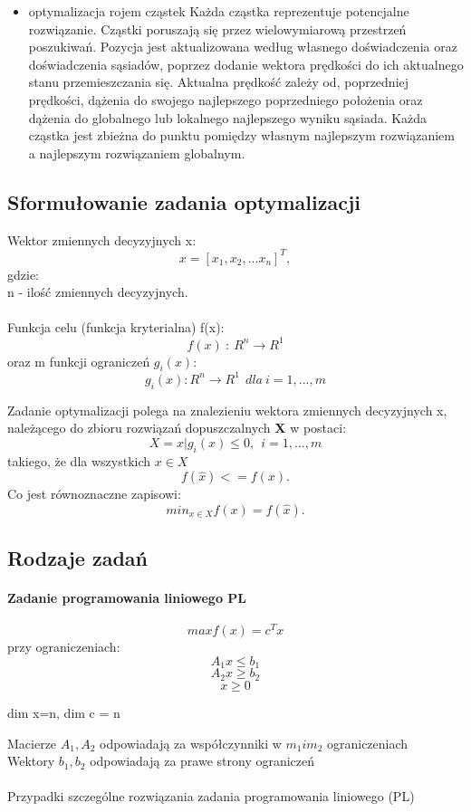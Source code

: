 \documentclass[a4paper,twoside]{report}
\begin{document}
\begin{itemize}
			\item optymalizacja rojem cząstek 
			Każda cząstka reprezentuje potencjalne rozwiązanie.
			Cząstki poruszają się przez wielowymiarową przestrzeń
			poszukiwań.
			Pozycja jest aktualizowana według własnego doświadczenia oraz doświadczenia sąsiadów, poprzez dodanie wektora
			prędkości do ich aktualnego stanu przemieszczania się.
			Aktualna prędkość zależy od, poprzedniej prędkości, dążenia do swojego najlepszego poprzedniego położenia oraz dążenia do globalnego lub lokalnego najlepszego wyniku sąsiada.
			Każda cząstka jest zbieżna do punktu pomiędzy własnym
			najlepszym rozwiązaniem a najlepszym rozwiązaniem
			globalnym.
			
			
		\end{itemize}

\subsection{Sformułowanie zadania optymalizacji}


Wektor zmiennych decyzyjnych x:
\[x=[x_1, x_2,...x_n]^T,\]
gdzie:\\
n - ilość zmiennych decyzyjnych.
\\\\
Funkcja celu (funkcja kryterialna) f(x):  
\[f(x)~:~R^n \longrightarrow R^1\]
oraz m funkcji ograniczeń $g_i(x)$:
\[g_i(x): R^n \longrightarrow R^1~~dla~i=1,...,m\]

Zadanie optymalizacji polega na znalezieniu wektora zmiennych decyzyjnych 
x, należącego do zbioru rozwiązań dopuszczalnych \textbf{X} w postaci:
\[X = {x|g_i(x) \le 0,~~i=1,...,m}\]
takiego, że dla wszystkich $x \in X$
\[f(\hat{x})<= f(x).\]
Co jest równoznaczne zapisowi:
\[min_{x \in X} f(x) = f(\hat{x}).\]

\subsection{Rodzaje zadań}


\paragraph{Zadanie programowania liniowego PL} 

\[ max f(x) = c^T x \]
przy ograniczeniach: 
\[A_1 x \le b_1\]
\[A_2 x \ge b_2\]
\[x \ge 0\]
  
\begin{center}
dim x=n, dim c = n
\end{center}
Macierze $A_1, A_2$ odpowiadają za współczynniki w $m_1 i m_2$ ograniczeniach
\\
Wektory $b_1, b_2$ odpowiadają za prawe strony ograniczeń
\\ \\
Przypadki szczególne rozwiązania zadania programowania liniowego
(PL)
\end{document}
